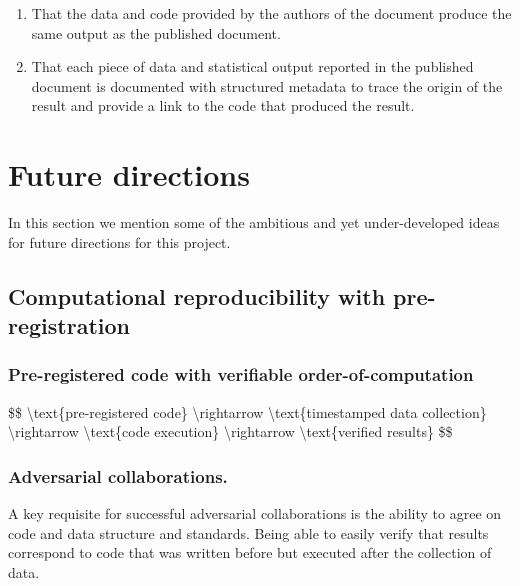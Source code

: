 \begin{enumerate}
\itemsep -0.2em
\item That the data and code provided by the authors of the document produce the same output as the published document.
\item That each piece of data and statistical output reported in the published document is documented with structured metadata to trace the origin of the result and provide a link to the code that produced the result.
\end{enumerate}

\hypertarget{future-directions}{%
\section{Future directions}\label{future-directions}}

In this section we mention some of the ambitious and yet under-developed ideas for future directions for this project.

\hypertarget{computational-reproducibility-with-pre-registration}{%
\subsection{Computational reproducibility with pre-registration}\label{computational-reproducibility-with-pre-registration}}

\hypertarget{pre-registered-code-with-verifiable-order-of-computation}{%
\subsubsection{Pre-registered code with verifiable order-of-computation}\label{pre-registered-code-with-verifiable-order-of-computation}}

\$\$ \textbackslash{}text\{pre-registered code\} \textbackslash{}rightarrow \textbackslash{}text\{timestamped data collection\} \textbackslash{}rightarrow \textbackslash{}text\{code execution\} \textbackslash{}rightarrow \textbackslash{}text\{verified results\} \$\$

\hypertarget{adversarial-collaborations.}{%
\subsubsection{Adversarial collaborations.}\label{adversarial-collaborations.}}

A key requisite for successful adversarial collaborations is the ability to agree on code and data structure and standards. Being able to easily verify that results correspond to code that was written before but executed after the collection of data.

